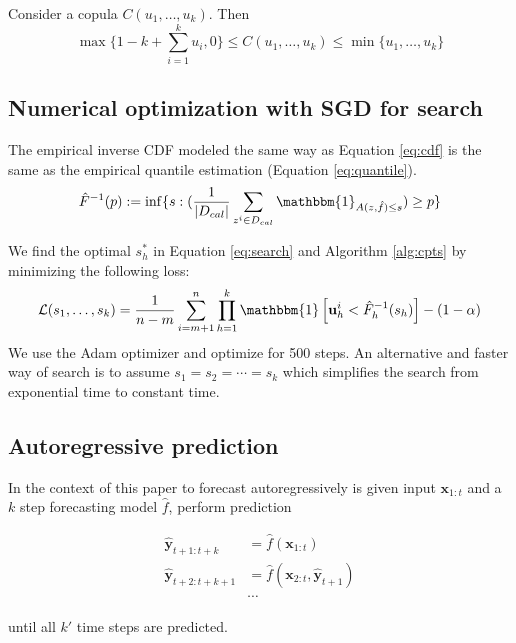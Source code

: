 
\begin{theorem}
Consider a copula $C(u_1, \ldots, u_k)$. Then
\[
\max{\{1-k+\sum_{i=1}^k u_i, 0\} } \leq C(u_1, \ldots, u_k) \leq \min{ \{u_1, \ldots, u_k \}}
\]
\label{lem:bounds}
\end{theorem}

\subsection{Numerical optimization with SGD for search}
The empirical inverse CDF modeled the same way as Equation \ref{eq:cdf} is the same as the empirical quantile estimation (Equation \ref{eq:quantile}).
\begin{equation}
    \hat{F}^{-1}(p) := \inf\{s: (\frac{1}{|D_{cal}|} \sum_{z^i \in D_{cal} } \mathbbm{1}_{A(z, \hat{f}) \leq s}) \geq p \}
    \label{eq:inverse_cdf}
\end{equation}


We find the optimal $s_h^*$ in Equation \ref{eq:search} and Algorithm \ref{alg:cpts} by minimizing the following loss: 
\[
\gL(s_1, \ldots, s_k) = \frac{1}{n-m} \sum_{i=m+1}^{n} \prod_{h=1}^k \mathbbm{1}\left[ \mathbf{u}^i_h < \hat{F}_h^{-1}(s_h) \right] - (1-\alpha) 
\]
We use the Adam optimizer and optimize for 500 steps. An alternative and faster way of search is to assume $s_1 = s_2 = \cdots = s_k$ which simplifies the search from exponential time to constant time. 

\subsection{Autoregressive prediction}
\label{lab:autoregressive}
In the context of this paper to forecast autoregressively is given input $\textbf{x}_{1:t}$ and a $k$ step forecasting model $\hat{f}$, perform prediction

\begin{align*}
    \hat{\textbf{y}}_{t+1:t+k} &= \hat{f}(\textbf{x}_{1:t}) \\
    \hat{\textbf{y}}_{t+2:t+k+1} &= \hat{f}(\textbf{x}_{2:t},  \hat{\textbf{y}}_{t+1}) \\
    & \cdots
\end{align*}

until all $k'$ time steps are predicted. 


